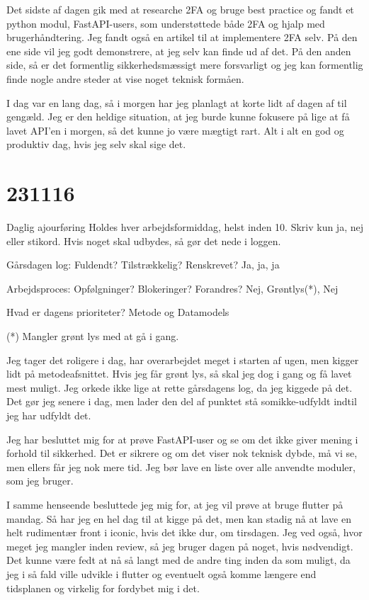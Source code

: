 \documentclass{report}
\begin{document}
Det sidste af dagen gik med at researche 2FA og bruge best practice og fandt et python modul, FastAPI-users, som understøttede både 2FA og hjalp med brugerhåndtering. Jeg fandt også en artikel til at implementere 2FA selv.
På den ene side vil jeg godt demonstrere, at jeg selv kan finde ud af det. På den anden side, så er det formentlig sikkerhedsmæssigt mere forsvarligt og jeg kan formentlig finde nogle andre steder at vise noget teknisk formåen.
 
I dag var en lang dag, så i morgen har jeg planlagt at korte lidt af dagen af til gengæld. Jeg er den heldige situation, at jeg burde kunne fokusere på lige at få lavet API'en i morgen, så det kunne jo være mægtigt rart. 
Alt i alt en god og produktiv dag, hvis jeg selv skal sige det.

\section{231116}
Daglig ajourføring
Holdes hver arbejdsformiddag, helst inden 10. Skriv kun ja, nej eller stikord. Hvis noget skal udbydes, så gør det nede i loggen.
 
Gårsdagen log: Fuldendt? Tilstrækkelig? Renskrevet?
Ja, ja, ja
 
Arbejdsproces: Opfølgninger? Blokeringer? Forandres?
Nej, Grøntlys(*), Nej
 
Hvad er dagens prioriteter?
Metode og Datamodels
 
(*) Mangler grønt lys med at gå i gang.
 
Jeg tager det roligere i dag, har overarbejdet meget i starten af ugen, men kigger lidt på metodeafsnittet. Hvis jeg får grønt lys, så skal jeg dog i gang og få lavet mest muligt.
Jeg orkede ikke lige at rette gårsdagens log, da jeg kiggede på det. Det gør jeg senere i dag, men lader den del af punktet stå somikke-udfyldt indtil jeg har udfyldt det.
 
Jeg har besluttet mig for at prøve FastAPI-user og se om det ikke giver mening i forhold til sikkerhed. Det er sikrere og om det viser nok teknisk dybde, må vi se, men ellers får jeg nok mere tid.
Jeg bør lave en liste over alle anvendte moduler, som jeg bruger.
 
I samme henseende besluttede jeg mig for, at jeg vil prøve at bruge flutter på mandag. Så har jeg en hel dag til at kigge på det, men kan stadig nå at lave en helt rudimentær front i iconic, hvis det ikke dur, om tirsdagen. Jeg ved også, hvor meget jeg mangler inden review, så jeg bruger dagen på noget, hvis nødvendigt.
Det kunne være fedt at nå så langt med de andre ting inden da som muligt, da jeg i så fald ville udvikle i flutter og eventuelt også komme længere end tidsplanen og virkelig for fordybet mig i det.
 
\end{document}
